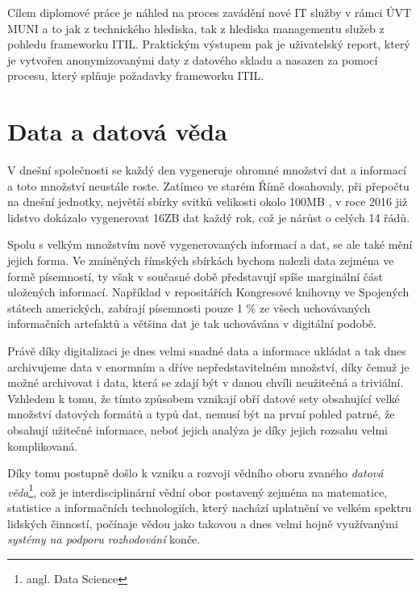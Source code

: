 \documentclass[
  digital,     %
  twoside,     %
  lof,         %
  lot,         %
]{fithesis4}
\begin{document}
Cílem diplomové práce je náhled na proces zavádění nové IT služby v rámci ÚVT MUNI a to jak z technického hlediska, tak z hlediska managementu služeb z pohledu frameworku ITIL. Praktickým výstupem pak je uživatelský report, který je vytvořen anonymizovanými daty z datového skladu a nasazen za pomocí procesu, který splňuje požadavky frameworku ITIL.

\section{Data a datová věda}
V dnešní společnosti se každý den vygeneruje ohromné množství dat a informací a toto množství neustále roste. Zatímco ve starém Římě dosahovaly, při přepočtu na dnešní jednotky, největší sbírky svitků velikosti okolo 100MB \parencite[p.~157]{Smil2021}, v roce 2016 již lidstvo dokázalo vygenerovat 16ZB dat každý rok\parencite[p.~160]{Smil2021}, což je nárůst o celých 14 řádů.

Spolu s velkým množstvím nově vygenerovaných informací a dat, se ale také mění jejich forma. Ve zmíněných římských sbírkách bychom nalezli data zejména ve formě písemností, ty však v současné době představují spíše marginální část uložených informací. Například v repositářích Kongresové knihovny ve Spojených státech amerických, zabírají písemnosti pouze 1 \% ze všech uchovávaných informačních artefaktů \parencite[p.~158]{Smil2021} a většina dat je tak uchovávána v digitální podobě.

Právě díky digitalizaci je dnes velmi snadné data a informace ukládat a tak dnes archivujeme data v enormním a dříve nepředstavitelném množství, díky čemuž je možné archivovat i data, která se zdají být v danou chvíli neužitečná a triviální. Vzhledem k tomu, že tímto způsobem vznikají obří datové sety obsahující velké množství datových formátů a typů dat, nemusí být na první pohled patrné, že obsahují užitečné informace, neboť jejich analýza je díky jejich rozsahu velmi komplikovaná.

Díky tomu postupně došlo k vzniku a rozvoji vědního oboru zvaného \emph{datová věda}\footnote{angl. Data Science}, což je interdisciplinární vědní obor postavený zejména na matematice, statistice a informačních technologiích, který nachází uplatnění ve velkém spektru lidských činností, počínaje vědou jako takovou a dnes velmi hojně využívanými \emph{systémy na podporu rozhodování} konče.
\end{document}
